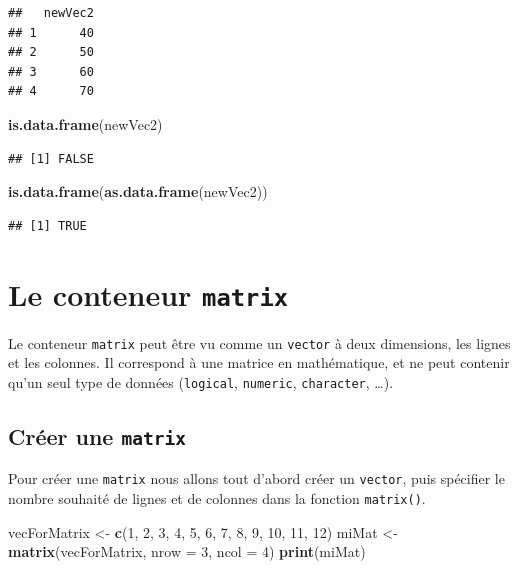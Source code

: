 \documentclass[]{book}
\newenvironment{Shaded}{\begin{snugshade}}{\end{snugshade}}
\newcommand{\KeywordTok}[1]{\textcolor[rgb]{0.13,0.29,0.53}{\textbf{#1}}}
\newcommand{\DataTypeTok}[1]{\textcolor[rgb]{0.13,0.29,0.53}{#1}}
\newcommand{\DecValTok}[1]{\textcolor[rgb]{0.00,0.00,0.81}{#1}}
\newcommand{\StringTok}[1]{\textcolor[rgb]{0.31,0.60,0.02}{#1}}
\newcommand{\NormalTok}[1]{#1}
\begin{document}
\begin{verbatim}
##   newVec2
## 1      40
## 2      50
## 3      60
## 4      70
\end{verbatim}

\begin{Shaded}
\begin{Highlighting}[]
\KeywordTok{is.data.frame}\NormalTok{(newVec2)}
\end{Highlighting}
\end{Shaded}

\begin{verbatim}
## [1] FALSE
\end{verbatim}

\begin{Shaded}
\begin{Highlighting}[]
\KeywordTok{is.data.frame}\NormalTok{(}\KeywordTok{as.data.frame}\NormalTok{(newVec2))}
\end{Highlighting}
\end{Shaded}

\begin{verbatim}
## [1] TRUE
\end{verbatim}

\section{\texorpdfstring{Le conteneur
\texttt{matrix}}{Le conteneur matrix}}\label{le-conteneur-matrix}

Le conteneur \texttt{matrix} peut être vu comme un \texttt{vector} à
deux dimensions, les lignes et les colonnes. Il correspond à une matrice
en mathématique, et ne peut contenir qu'un seul type de données
(\texttt{logical}, \texttt{numeric}, \texttt{character}, \ldots{}).

\subsection{\texorpdfstring{Créer une
\texttt{matrix}}{Créer une matrix}}\label{creer-une-matrix}

Pour créer une \texttt{matrix} nous allons tout d'abord créer un
\texttt{vector}, puis spécifier le nombre souhaité de lignes et de
colonnes dans la fonction \texttt{matrix()}.

\begin{Shaded}
\begin{Highlighting}[]
\NormalTok{vecForMatrix <-}\StringTok{ }\KeywordTok{c}\NormalTok{(}\DecValTok{1}\NormalTok{, }\DecValTok{2}\NormalTok{, }\DecValTok{3}\NormalTok{, }\DecValTok{4}\NormalTok{, }\DecValTok{5}\NormalTok{, }\DecValTok{6}\NormalTok{, }\DecValTok{7}\NormalTok{, }\DecValTok{8}\NormalTok{, }\DecValTok{9}\NormalTok{, }\DecValTok{10}\NormalTok{, }\DecValTok{11}\NormalTok{, }\DecValTok{12}\NormalTok{)}
\NormalTok{miMat <-}\StringTok{ }\KeywordTok{matrix}\NormalTok{(vecForMatrix, }\DataTypeTok{nrow =} \DecValTok{3}\NormalTok{, }\DataTypeTok{ncol =} \DecValTok{4}\NormalTok{)}
\KeywordTok{print}\NormalTok{(miMat)}
\end{Highlighting}
\end{Shaded}
\end{document}
